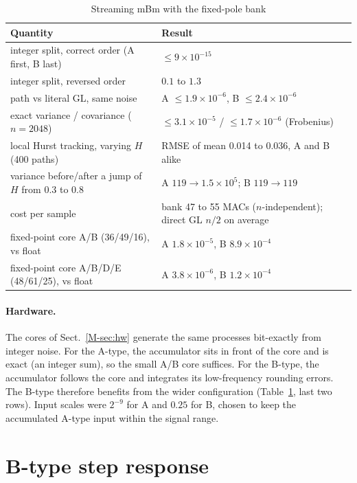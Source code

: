 \begin{table}[t]
\caption{Streaming mBm with the fixed-pole bank}\label{tab:mbm}
\small
\begin{tabular}{@{}>{\raggedright\arraybackslash}p{}>{\raggedright\arraybackslash}p{}@{}}
\toprule
Quantity & Result\\
\midrule
integer split, correct order (A first, B last) & $\le9\times10^{-15}$\\
integer split, reversed order & $0.1$ to $1.3$\\
path vs literal GL, same noise & A $\le1.9\times10^{-6}$, B $\le2.4\times10^{-6}$\\
exact variance / covariance ($n=2048$) & $\le3.1\times10^{-5}$ / $\le1.7\times10^{-6}$ (Frobenius)\\
local Hurst tracking, varying $H$ (400 paths) & RMSE of mean 0.014 to 0.036, A and B alike\\
variance before/after a jump of $H$ from $0.3$ to $0.8$ & A $119\to1.5\times10^{5}$; B $119\to119$\\
cost per sample & bank 47 to 55 MACs ($n$-independent); direct GL $n/2$ on average\\
fixed-point core A/B (36/49/16), vs float & A $1.8\times10^{-5}$, B $8.9\times10^{-4}$\\
fixed-point core A/B/D/E (48/61/25), vs float & A $3.8\times10^{-6}$, B $1.2\times10^{-4}$\\
\bottomrule
\end{tabular}
\end{table}

\paragraph{Hardware.} The cores of Sect.~\ref{M-sec:hw} generate the same processes bit-exactly from integer noise. For the A-type, the accumulator sits in front of the core and is exact (an integer sum), so the small A/B core suffices. For the B-type, the accumulator follows the core and integrates its low-frequency rounding errors. The B-type therefore benefits from the wider configuration (Table~\ref{tab:mbm}, last two rows). Input scales were $2^{-9}$ for A and $0.25$ for B, chosen to keep the accumulated A-type input within the signal range.




\section{B-type step response}\label{sup:stepB}

